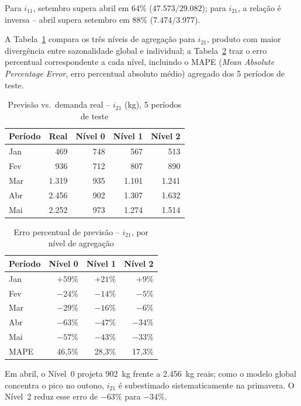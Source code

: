 \documentclass[fleqn,12pt,a4paper]{article}
\begin{document}
Para $i_{11}$, setembro supera abril em 64\% ($47{.}573/29{.}082$);
para $i_{21}$, a relação é inversa -- abril supera setembro em 88\% ($7{.}474/3{.}977$).

A Tabela~\ref{tab:fc_i21_valores} compara os três níveis de agregação para $i_{21}$,
produto com maior divergência entre sazonalidade global e individual; a
Tabela~\ref{tab:fc_i21_erro} traz o erro percentual correspondente a cada nível,
incluindo o MAPE (\textit{Mean Absolute Percentage Error}, erro percentual absoluto
médio) agregado dos 5 períodos de teste.

\begin{table}[ht]
\centering
\small
\caption{Previsão vs.\ demanda real -- $i_{21}$ (kg), 5 períodos de teste}
\label{tab:fc_i21_valores}
\begin{tabular}{lrrrr}
\toprule
\textbf{Período} & \textbf{Real} & \textbf{Nível 0} & \textbf{Nível 1} & \textbf{Nível 2} \\
\midrule
Jan &   469 &   748 &   567 &   513 \\
Fev &   936 &   712 &   807 &   890 \\
Mar & 1.319 &   935 & 1.101 & 1.241 \\
Abr & 2.456 &   902 & 1.307 & 1.632 \\
Mai & 2.252 &   973 & 1.274 & 1.514 \\
\bottomrule
\end{tabular}
\end{table}

\begin{table}[ht]
\centering
\small
\caption{Erro percentual de previsão -- $i_{21}$, por nível de agregação}
\label{tab:fc_i21_erro}
\begin{tabular}{lrrr}
\toprule
\textbf{Período} & \textbf{Nível 0} & \textbf{Nível 1} & \textbf{Nível 2} \\
\midrule
Jan & $+59\%$ & $+21\%$ &  $+9\%$ \\
Fev & $-24\%$ & $-14\%$ &  $-5\%$ \\
Mar & $-29\%$ & $-16\%$ &  $-6\%$ \\
Abr & $-63\%$ & $-47\%$ & $-34\%$ \\
Mai & $-57\%$ & $-43\%$ & $-33\%$ \\
\midrule
MAPE & 46,5\% & 28,3\% & 17,3\% \\
\bottomrule
\end{tabular}
\end{table}

Em abril, o Nível~0 projeta 902~kg frente a 2.456~kg reais; como o modelo global
concentra o pico no outono, $i_{21}$ é subestimado sistematicamente na primavera.
O Nível~2 reduz esse erro de $-63\%$ para $-34\%$.
\end{document}
